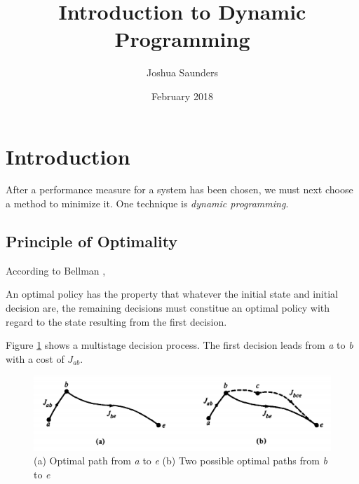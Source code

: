 \documentclass{article}
\title{Introduction to Dynamic Programming}
\author{Joshua Saunders}
\date{February 2018}
\begin{document}
\maketitle

\section{Introduction}

After a performance measure for a system has been chosen, we must next choose a
method to minimize it. One technique is \textit{dynamic programming}.

\subsection{Principle of Optimality}

According to Bellman \cite{bellman2015applied},

\begin{displayquote}
An optimal policy has the property that whatever the initial state and initial
decision are, the remaining decisions must constitue an optimal policy with
regard to the state resulting from the first decision.
\end{displayquote}

Figure \ref{fig:optimal_paths} shows a multistage decision process. The first
decision leads from \textit{a} to \textit{b} with a cost of $J_{ab}$.

\begin{figure}[h]
    \begin{center}
        \includegraphics[scale=0.3]{optimality_principle_paths}
        \caption{
          (a) Optimal path from \textit{a} to \textit{e}
          (b) Two possible optimal paths from \textit{b} to \textit{e}
          \cite{kirkdover}
        }
        \label{fig:optimal_paths}
    \end{center}
\end{figure}

\newpage


\end{document}
